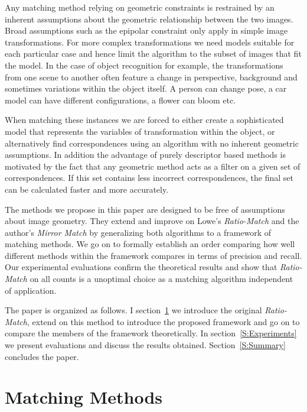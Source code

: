 \documentclass[journal]{IEEEtran}
\begin{document}
Any matching method relying on geometric constraints is restrained by an
inherent assumptions about the geometric relationship between the two 
images. Broad assumptions such as the epipolar constraint only apply in 
simple image transformations. For more complex transformations we need 
models suitable for each particular case and hence limit the algorithm 
to the subset of images that fit the model.  In the case of object 
recognition for example, the transformations from one scene to another 
often feature a change
in perspective, background and sometimes variations within the object 
itself.  A person can change pose, a car model can have different 
configurations, a flower can bloom etc.

When matching these instances we are forced to either create a 
sophisticated model that represents the variables of transformation 
within the object, or alternatively find correspondences using an 
algorithm with no inherent geometric assumptions. In addition the 
advantage of purely descriptor based methods is motivated by the fact 
that any geometric method acts as a filter on a given set of 
correspondences.  If this set contains less incorrect correspondences, 
the final set can be calculated faster and more accurately.

The methods we propose in this paper are designed to be free of 
assumptions about image geometry. They extend and improve on Lowe's 
\emph{Ratio-Match} \cite{lowe2004sift} and the author's \emph{Mirror 
Match} \cite{arnfred2013mirror} by generalizing both algorithms to a 
framework of matching methods. We go on to formally establish an order 
comparing how well different methods within the framework compares in 
terms of precision and recall. Our experimental evaluations confirm the 
theoretical results and show that \emph{Ratio-Match} on all counts is a 
unoptimal choice as a matching algorithm independent of application.

The paper is organized as follows. I section~\ref{S:MatchingMethods} we 
introduce the original \emph{Ratio-Match}, extend on this method to 
introduce the proposed framework and go on to compare the members of the 
framework theoretically.  In section~\ref{S:Experiments} we present 
evaluations and discuss the results obtained.  Section~\ref{S:Summary} 
concludes the paper.

\section{Matching Methods}
\label{S:MatchingMethods}
%
\end{document}
